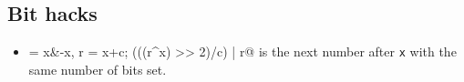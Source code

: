   \subsection{Bit hacks}
    \begin{itemize}
      \item \verb@c = x&-x, r = x+c; (((r^x) >> 2)/c) | r@ is the next number after \texttt{x} with the same number of bits set.
    \end{itemize}
